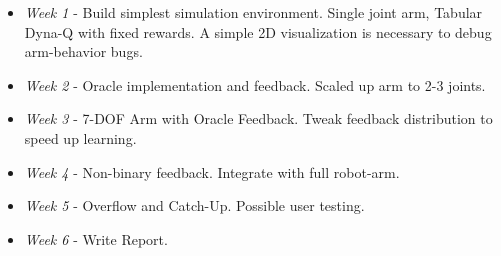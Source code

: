 \documentclass{article}
\begin{document}
\begin{itemize}
    \item \textit{Week 1} - Build simplest simulation environment. Single joint arm, Tabular Dyna-Q with fixed rewards. A simple 2D visualization is necessary to debug arm-behavior bugs.  
    \item \textit{Week 2} - Oracle implementation and feedback. Scaled up arm to 2-3 joints.
    \item \textit{Week 3} - 7-DOF Arm with Oracle Feedback. Tweak feedback distribution to speed up learning.
    \item \textit{Week 4} - Non-binary feedback. Integrate with full robot-arm. 
    \item \textit{Week 5} - Overflow and Catch-Up. Possible user testing. 
    \item \textit{Week 6} - Write Report.
\end{itemize}




\end{document}
